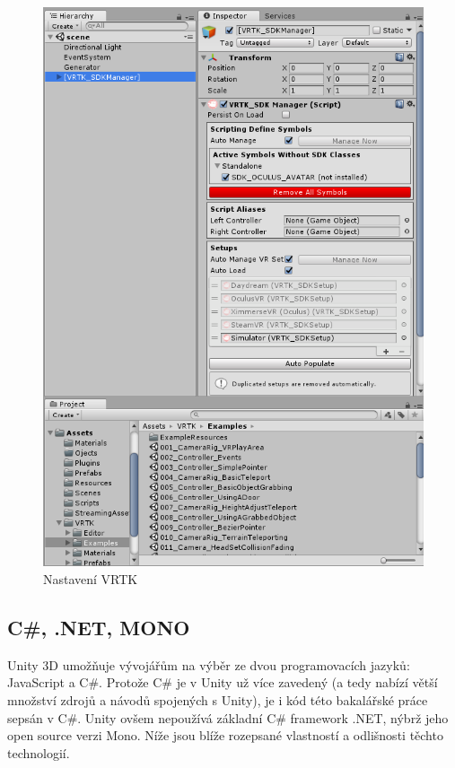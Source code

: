 \documentclass[thesis=B,czech]{FITthesis}[2012/06/26]
\begin{document}
	\begin{figure}
  		\includegraphics{VRTKsetup.png}
  		\caption{Nastavení VRTK}
  		\label{fig:VRTKsetup}
	\end{figure}
	
	\subsection{C\#, .NET, MONO}
	
	Unity 3D umožňuje vývojářům na výběr ze dvou programovacích jazyků: JavaScript a C\#. Protože C\# je v Unity už více zavedený (a tedy nabízí větší množství zdrojů a návodů spojených s Unity), je i kód této bakalářské práce sepsán v C\#. Unity ovšem nepoužívá základní C\# framework .NET, nýbrž jeho open source verzi Mono. Níže jsou blíže rozepsané vlastností a odlišnosti těchto technologií.
	
\end{document}
